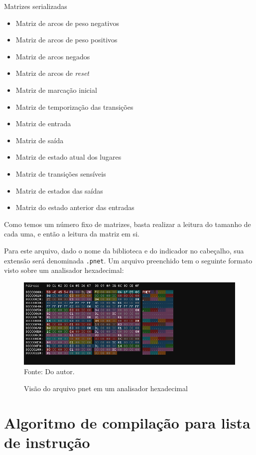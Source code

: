 Matrizes serializadas
\begin{itemize} 
	\item Matriz de arcos de peso negativos
	\item Matriz de arcos de peso positivos
	\item Matriz de arcos negados
	\item Matriz de arcos de \textit{reset}
	\item Matriz de marcação inicial
	\item Matriz de temporização das transições
	\item Matriz de entrada
	\item Matriz de saída
	\item Matriz de estado atual dos lugares
	\item Matriz de transições sensíveis
	\item Matriz de estados das saídas
	\item Matriz do estado anterior das entradas
\end{itemize}

Como temos um número fixo de matrizes, basta realizar a leitura do tamanho de cada uma, e então a leitura da matriz em si. 

Para este arquivo, dado o nome da biblioteca e do indicador no cabeçalho, sua extensão será denominada \lstinline{.pnet}. Um arquivo preenchido tem o seguinte formato visto sobre um analisador hexadecimal:

\begin{figure}[h!]
	\centering
	\caption{Visão do arquivo pnet em um analisador hexadecimal}
	\includegraphics[width=16cm]{images/hexfile.png}
	\label{fig:hexfile}
	\footnotesize{Fonte: Do autor.}
\end{figure}

\pagebreak

\section{Algoritmo de compilação para lista de instrução}

